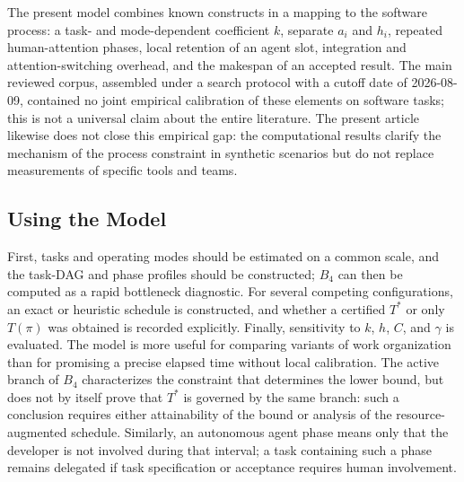 The present model combines known constructs in a mapping to the software
process: a task- and mode-dependent coefficient $k$, separate $a_i$ and $h_i$,
repeated human-attention phases, local retention of an agent slot, integration
and attention-switching overhead, and the makespan of an accepted result. The
main reviewed corpus, assembled under a search protocol with a cutoff date of
2026-08-09, contained no joint empirical calibration of these elements on
software tasks; this is not a universal claim about the entire literature. The
present article likewise does not close this empirical gap: the computational
results clarify the mechanism of the process constraint in synthetic scenarios
but do not replace measurements of specific tools and teams.

\subsection{Using the Model}

First, tasks and operating modes should be estimated on a common scale, and the
task-DAG and phase profiles should be constructed; $B_4$ can then be computed as
a rapid bottleneck diagnostic. For several competing configurations, an exact
or heuristic schedule is constructed, and whether a certified $T^*$ or only
$T(\pi)$ was obtained is recorded explicitly. Finally, sensitivity to $k$, $h$,
$C$, and $\gamma$ is evaluated. The model is more useful for comparing variants
of work organization than for promising a precise elapsed time without local
calibration. The active branch of $B_4$ characterizes the constraint that
determines the lower bound, but does not by itself prove that $T^*$ is governed
by the same branch: such a conclusion requires either
attainability of the bound or analysis of the resource-augmented schedule.
Similarly, an autonomous agent phase means only that the developer is not
involved during that interval; a task containing such a phase remains delegated
if task specification or acceptance requires human involvement.
